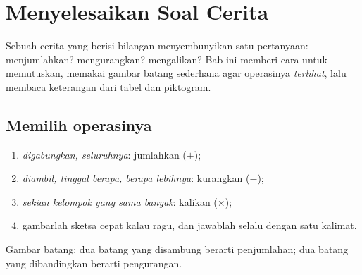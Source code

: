 \chapter{Menyelesaikan Soal Cerita}\label{ch:g2:problems}

Sebuah cerita yang berisi bilangan menyembunyikan satu pertanyaan:
menjumlahkan? mengurangkan? mengalikan? Bab ini memberi cara untuk
memutuskan, memakai gambar batang sederhana agar operasinya
\emph{terlihat}, lalu membaca keterangan dari tabel dan piktogram.

\section{Memilih operasinya}

\begin{method}\label{met:g2:problems:choose}
\begin{enumerate}
  \item \emph{digabungkan, seluruhnya}: jumlahkan ($+$);
  \item \emph{diambil, tinggal berapa, berapa lebihnya}: kurangkan
        ($-$);
  \item \emph{sekian kelompok yang sama banyak}: kalikan ($\times$);
  \item gambarlah sketsa cepat kalau ragu, dan jawablah selalu
        dengan satu kalimat.
\end{enumerate}
\end{method}

\begin{omfigure}

{\small Gambar batang: dua batang yang disambung berarti penjumlahan;
dua batang yang dibandingkan berarti pengurangan.}
\end{omfigure}

